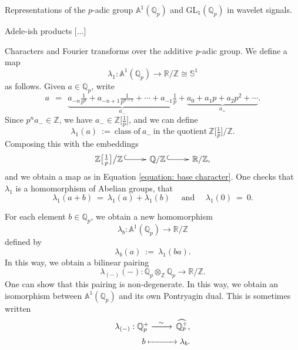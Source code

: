 \documentclass[letterpaper,11pt, reqno]{amsart}
\makeatletter
\newtheorem{monodromy theorem}{Monodromy Theorem}[subsection]
\newtheorem{wild conjecture}[theorem]{Wild Conjecture}
\newtheorem{research objectives}{Research objectives}[subsection]
\newtheorem{research question}[theorem]{Research questions}
\newtheorem{aside question}[theorem]{Aside question}
\newtheorem{audio example}[theorem]{\loudspeaker[3] Example}
\newtheorem{blank remark}[theorem]{}
\newtheorem{terminology and comment}[theorem]{Terminology and comment}
\newtheorem{purity hypothesis}[theorem]{Purity hypothesis}
\newtheorem{corollary of the purity hypothesis}[theorem]{Corollary of the purity hypothesis}
\newcommand{\QQ} {{\mathbb Q}}
\newcommand{\RR} {{\mathbb R}}
\newcommand{\ZZ} {{\mathbb Z}}
\newcommand{\lra}{{\longrightarrow}}
\newcommand{\mono}{\!\xymatrix{{}\ar@{^{(}->}[r]&{}}\!}
\numberwithin{equation}{theorem}
\makeatother
\begin{document}
\begin{section}{Representations of the $p$-adic group $\mathbb{A}^{\!1}(\mathbb{Q}_{p})$
and $\text{GL}_{1}(\mathbb{Q}_{p})$
in wavelet signals.}
\begin{subsection}{Adele-ish products}
{\color{red} [...]}

\end{subsection}

\begin{subsection}{Characters and Fourier transforms over the additive {\em p}-adic group.}
We define a map
	\begin{equation}\label{equation: base character}
	\lambda_{1}:\mathbb{A}^{\!1}(\QQ_p)\lra\RR/\ZZ\cong\mathbb{S}^{1}
	\end{equation}
as follows. Given $a\in\QQ_p$, write
	$$
	a
	\ \ =\ \ 
	\underset{a_{-}}{
	\underbrace{a_{-n}\tfrac{1}{p^n}+a_{-n+1}\tfrac{1}{p^{n-1}}+\cdots+a_{-1}\tfrac{1}{p}}}
	+
	\underset{a_{+}}{
	\underbrace{
	a_0+a_1 p+a_2 p^2+\cdots
	}}.
	$$
Since $p^{n}a_{-}\in\ZZ$, we have $a_{-}\in\ZZ\big[\tfrac{1}{p}\big]$, and we can define
	$$
	\lambda_{1}(a)
	\ :=\ 
	\text{class of}\ a_{-}\ \text{in the quotient}\ \ZZ\big[\tfrac{1}{p}\big]\big/\ZZ.
	$$
Composing this with the embeddings
	$$
	\ZZ\big[\tfrac{1}{p}\big]\big/\ZZ
	\mono
	\QQ/\ZZ
	\mono
	\RR/\ZZ,
	$$
and we obtain a map as in Equation \eqref{equation: base character}. One checks that $\lambda_1$ is a homomorphism of Abelian groups, that
	$$
	\lambda_{1}(a+b)
	\ =\ 
	\lambda_{1}(a)+\lambda_{1}(b)
	\ \ \ \ \ \ \text{and}\ \ \ \ \ \ 
	\lambda_{1}(0)
	\ =\ 
	0.
	$$

	For each element $b\in\QQ_{p}$, we obtain a new homomorphism
	$$
	\lambda_{b}:\mathbb{A}^{\!1}(\QQ_{p})\lra\RR/\ZZ
	$$
defined by
	$$
	\lambda_{b}(a)\ :=\ \lambda_{1}(ba).
	$$
In this way, we obtain a bilinear pairing
	$$
	\lambda_{(-)}(-):
	\QQ_{p}\otimes_{\ZZ}\QQ_{p}\lra\RR/\ZZ.
	$$
One can show that this pairing is non-degenerate. In this way, we obtain an isomorphism between $\mathbb{A}^{\!1}(\QQ_{p})$ and its own Pontryagin dual. This is sometimes written
	$$
	\begin{array}{c}
	\lambda_{(-)}:\QQ^{+}_{p}\xrightarrow{\ \ \sim\ \ }\ \!\widehat{\QQ^{+}_{p}},
	\\[6pt]
	\ \ \ \ \ \ \ \ \ \ b\xmapsto{\ \ \ \ \ \ \ \ \ } \lambda_{b}.
	\end{array}
	$$
	

\end{subsection}
\end{section}
\end{document}
